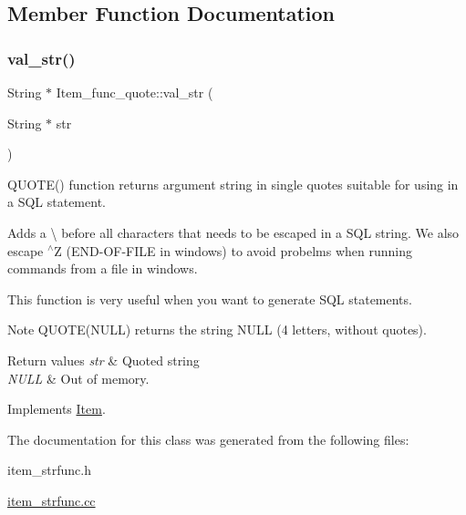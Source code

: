 \subsection{Member Function Documentation}
\mbox{\label{classItem__func__quote_a44ccde4f58317a8d7bd29e22a6ef3985}} 
\subsubsection{\texorpdfstring{val\+\_\+str()}{val\_str()}}
{\footnotesize\ttfamily String $\ast$ Item\+\_\+func\+\_\+quote\+::val\+\_\+str (\begin{DoxyParamCaption}\item[{String $\ast$}]{str }\end{DoxyParamCaption})\hspace{0.3cm}{\ttfamily [virtual]}}

Q\+U\+O\+T\+E() function returns argument string in single quotes suitable for using in a S\+QL statement.

Adds a \textbackslash{} before all characters that needs to be escaped in a S\+QL string. We also escape \textquotesingle{}$^\wedge$Z\textquotesingle{} (E\+ND-\/OF-\/F\+I\+LE in windows) to avoid probelms when running commands from a file in windows.

This function is very useful when you want to generate S\+QL statements.

\begin{DoxyNote}{Note}
Q\+U\+O\+T\+E(\+N\+U\+L\+L) returns the string \textquotesingle{}N\+U\+LL\textquotesingle{} (4 letters, without quotes).
\end{DoxyNote}

\begin{DoxyRetVals}{Return values}
{\em str} & Quoted string \\
\hline
{\em N\+U\+LL} & Out of memory. \\
\hline
\end{DoxyRetVals}


Implements \mbox{\hyperlink{classItem}{Item}}.



The documentation for this class was generated from the following files\+:\begin{DoxyCompactItemize}
\item 
item\+\_\+strfunc.\+h\item 
\mbox{\hyperlink{item__strfunc_8cc}{item\+\_\+strfunc.\+cc}}\end{DoxyCompactItemize}
